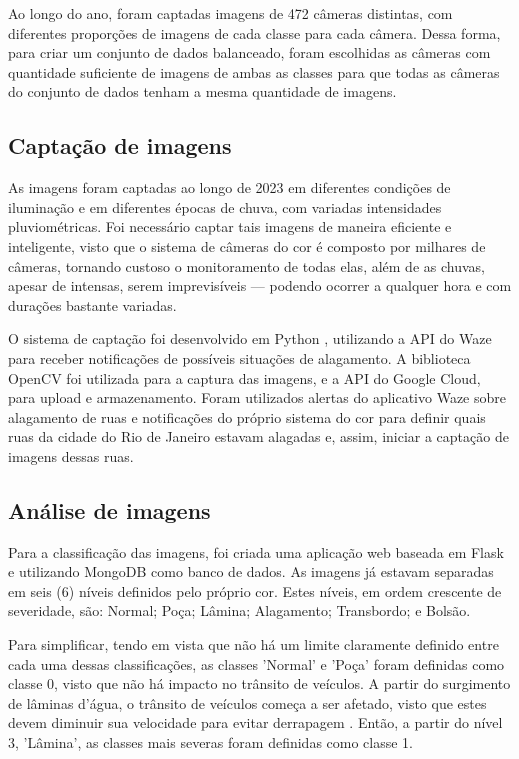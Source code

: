 Ao longo do ano, foram captadas imagens de 472 câmeras distintas, com diferentes proporções de imagens de cada classe para cada câmera.
Dessa forma, para criar um conjunto de dados balanceado,
foram escolhidas as câmeras com quantidade suficiente de imagens de ambas as classes para que todas as câmeras do conjunto de dados tenham a mesma quantidade de imagens.


\subsection{Captação de imagens}
As imagens foram captadas ao longo de 2023 em diferentes condições de iluminação e em diferentes épocas de chuva, com variadas intensidades pluviométricas.
Foi necessário captar tais imagens de maneira eficiente e inteligente, visto que o sistema de câmeras do \acrshort{cor} é composto por milhares de câmeras,
tornando custoso o monitoramento de todas elas, além de as chuvas, apesar de intensas, serem imprevisíveis — podendo ocorrer a qualquer hora e com durações bastante variadas.

O sistema de captação foi desenvolvido em Python \cite{van1995python}, utilizando a API do Waze para receber notificações de possíveis situações de alagamento.
A biblioteca OpenCV \cite{itseez2015opencv} foi utilizada para a captura das imagens, e a API do Google Cloud, para upload e armazenamento.
Foram utilizados alertas do aplicativo Waze sobre alagamento de ruas e notificações do próprio sistema do \acrshort{cor} para definir quais ruas da cidade do Rio de Janeiro estavam alagadas e, assim, iniciar a captação de imagens dessas ruas.

\subsection{Análise de imagens}
Para a classificação das imagens, foi criada uma aplicação web baseada em Flask e utilizando MongoDB como banco de dados.
As imagens já estavam separadas em seis (6) níveis definidos pelo próprio \acrshort{cor}. Estes níveis, em ordem crescente de severidade, são: Normal; Poça; Lâmina; Alagamento; Transbordo; e Bolsão.

Para simplificar, tendo em vista que não há um limite claramente definido entre cada uma dessas classificações, as classes 'Normal' e 'Poça' foram definidas como classe 0,
visto que não há impacto no trânsito de veículos. A partir do surgimento de lâminas d'água,
o trânsito de veículos começa a ser afetado, visto que estes devem diminuir sua velocidade para evitar derrapagem \cite{michelinaquaplaning}.
Então, a partir do nível 3, 'Lâmina', as classes mais severas foram definidas como classe 1.

